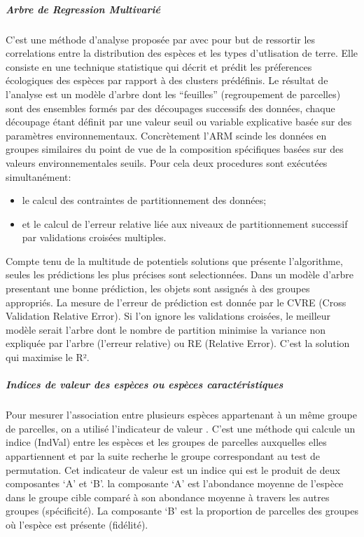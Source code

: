 \documentclass[
  12pt,
  a4paper,
  extrafontsizes,
  onecolumn,
  openright]{book}
\theoremstyle{definition}
\theoremstyle{definition}
\theoremstyle{definition}
\theoremstyle{definition}
\theoremstyle{remark}
\begin{document}
\hypertarget{arbre-de-regression-multivariuxe9}{%
\subparagraph{Arbre de Regression Multivarié}\label{arbre-de-regression-multivariuxe9}}

C'est une méthode d'analyse proposée par \citet{Death2002} avec pour but de ressortir les correlations entre la distribution des espèces et les types d'utlisation de terre. Elle consiste en une technique statistique qui décrit et prédit les préferences écologiques des espèces par rapport à des clusters prédéfinis. Le résultat de l'analyse est un modèle d'arbre dont les \enquote{feuilles} (regroupement de parcelles) sont des ensembles formés par des découpages successifs des données, chaque découpage étant définit par une valeur seuil ou variable explicative basée sur des paramètres environnementaux. Concrètement l'ARM scinde les données en groupes similaires du point de vue de la composition spécifiques basées sur des valeurs environnementales seuils. Pour cela deux procedures sont exécutées simultanément:

\begin{itemize}
\item
  le calcul des contraintes de partitionnement des données;
\item
  et le calcul de l'erreur relative liée aux niveaux de partitionnement successif par validations croisées multiples.
\end{itemize}

Compte tenu de la multitude de potentiels solutions que présente l'algorithme, seules les prédictions les plus précises sont selectionnées. Dans un modèle d'arbre presentant une bonne prédiction, les objets sont assignés à des groupes appropriés. La mesure de l'erreur de prédiction est donnée par le CVRE (Cross Validation Relative Error). Si l'on ignore les validations croisées, le meilleur modèle serait l'arbre dont le nombre de partition minimise la variance non expliquée par l'arbre (l'erreur relative) ou RE (Relative Error). C'est la solution qui maximise le R².

\hypertarget{indices-de-valeur-des-espuxe8ces-ou-espuxe8ces-caractuxe9ristiques}{%
\subparagraph{Indices de valeur des espèces ou espèces caractéristiques}\label{indices-de-valeur-des-espuxe8ces-ou-espuxe8ces-caractuxe9ristiques}}

Pour mesurer l'association entre plusieurs espèces appartenant à un même groupe de parcelles, on a utilisé l'indicateur de valeur \citep{Dufrene_Legendre1997, DeCaceres_Legendre2009}. C'est une méthode qui calcule un indice (IndVal) entre les espèces et les groupes de parcelles auxquelles elles appartiennent et par la suite recherhe le groupe correspondant au test de permutation. Cet indicateur de valeur est un indice qui est le produit de deux composantes \enquote*{A} et \enquote*{B}. la composante \enquote*{A} est l'abondance moyenne de l'espèce dans le groupe cible comparé à son abondance moyenne à travers les autres groupes (spécificité). La composante \enquote*{B} est la proportion de parcelles des groupes où l'espèce est présente (fidélité).
\end{document}
